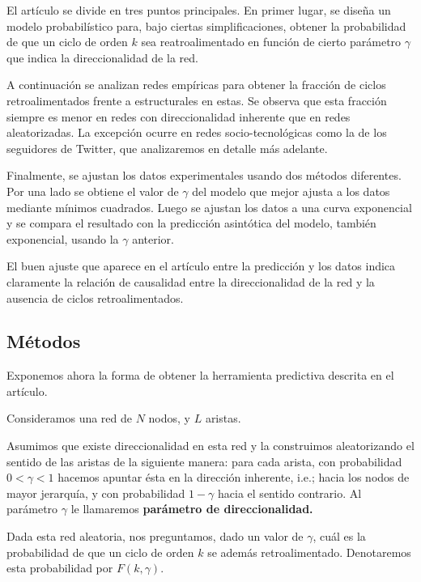 \documentclass[1p]{elsarticle}
\begin{document}
    El artículo se divide en tres puntos principales.
    En primer lugar, se diseña un modelo probabilístico para, bajo ciertas simplificaciones, obtener la probabilidad de que un ciclo de orden $k$ sea reatroalimentado en función de cierto parámetro $\gamma$ que indica la direccionalidad de la red.

    A continuación se analizan redes empíricas para obtener la fracción de ciclos retroalimentados frente a estructurales en estas.
    Se observa que esta fracción siempre es menor en redes con direccionalidad inherente que en redes aleatorizadas. 
    La excepción ocurre en redes socio-tecnológicas como la de los seguidores de Twitter, que analizaremos en detalle más adelante.
 
    
    Finalmente, se ajustan los datos experimentales usando dos métodos diferentes.
    Por una lado se obtiene el valor de $\gamma$ del modelo que mejor ajusta a los datos mediante mínimos cuadrados.
    Luego se ajustan los datos a una curva exponencial y se compara el resultado con la predicción asintótica del modelo, también exponencial, usando la $\gamma$ anterior.

    El buen ajuste que aparece en el artículo entre la predicción y los datos indica claramente la relación de causalidad entre la direccionalidad de la red y la ausencia de ciclos retroalimentados.


\subsection{Métodos}
    Exponemos ahora la forma de obtener la herramienta predictiva descrita en el artículo.

    Consideramos una red de $N$ nodos, y $L$ aristas.
     
    Asumimos que existe direccionalidad en esta red y la construimos aleatorizando el sentido de las aristas de la siguiente manera:
    para cada arista, con probabilidad $0<\gamma<1$ hacemos apuntar ésta en la dirección inherente, i.e.; hacia los nodos de mayor jerarquía, y con probabilidad $1-\gamma$ hacia el sentido contrario.
    Al parámetro $\gamma$ le llamaremos \textbf{parámetro de direccionalidad.}

    Dada esta red aleatoria, nos preguntamos, dado un valor de $\gamma$, cuál es la probabilidad de que un ciclo de orden $k$ se además retroalimentado. 
    Denotaremos esta probabilidad por $F(k, \gamma)$.
\end{document}
